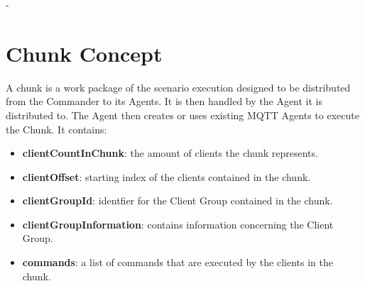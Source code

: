 -\section{Chunk Concept}
A chunk is a work package of the scenario execution designed to be distributed from the Commander to its Agents.
It is then handled by the Agent it is distributed to.
The Agent then creates or uses existing MQTT Agents to execute the Chunk.
It contains:
\begin{itemize}
	\item \textbf{clientCountInChunk}: the amount of clients the chunk represents.
	\item \textbf{clientOffset}: starting index of the clients contained in the chunk.
	\item \textbf{clientGroupId}: identfier for the Client Group contained in the chunk.
	\item \textbf{clientGroupInformation}: contains information concerning the Client Group.
	\item \textbf{commands}: a list of commands that are executed by the clients in the chunk.
\end{itemize}

